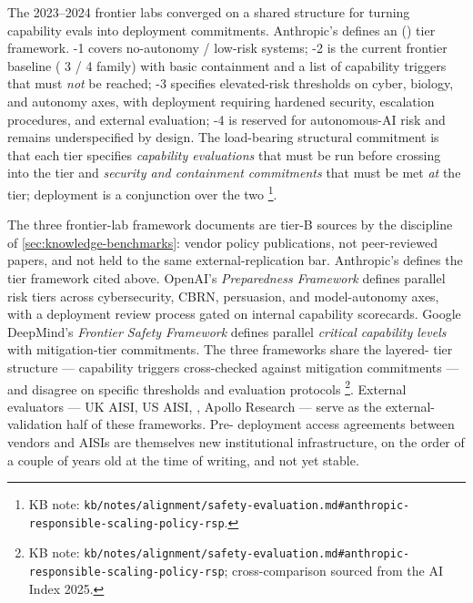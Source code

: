The 2023--2024 frontier labs converged on a shared structure for
turning capability evals into deployment commitments. Anthropic's
\emph{} \citep{anthropic-rsp-2024}
defines an  () tier framework. -1 covers
no-autonomy / low-risk systems; -2 is the current frontier
baseline ( 3 /  4 family) with basic containment and a
list of capability triggers that must \emph{not} be reached; -3
specifies elevated-risk thresholds on cyber, biology, and autonomy
axes, with deployment requiring hardened security, escalation
procedures, and external evaluation; -4 is reserved for
autonomous-AI risk and remains underspecified by design. The
load-bearing structural commitment is that each tier specifies
\emph{capability evaluations} that must be run before crossing into
the tier and \emph{security and containment commitments} that must be
met \emph{at} the tier; deployment is a conjunction over the two%
\footnote{KB note: \texttt{kb/notes/alignment/safety-evaluation.md\#anthropic-responsible-scaling-policy-rsp}.}.

\begin{forumsignal}
The three frontier-lab framework documents are tier-B sources by the
discipline of \cref{sec:knowledge-benchmarks}: vendor policy
publications, not peer-reviewed papers, and not held to the same
external-replication bar. Anthropic's 
\citep{anthropic-rsp-2024} defines the  tier framework cited
above. OpenAI's \emph{Preparedness Framework}
defines parallel risk tiers across cybersecurity, CBRN, persuasion,
and model-autonomy axes, with a deployment review process gated on
internal capability scorecards. Google DeepMind's \emph{Frontier
Safety Framework}
defines parallel \emph{critical capability levels} with
mitigation-tier commitments. The three frameworks share the layered-
tier structure --- capability triggers cross-checked against
mitigation commitments --- and disagree on specific thresholds and
evaluation protocols%
\footnote{KB note: \texttt{kb/notes/alignment/safety-evaluation.md\#anthropic-responsible-scaling-policy-rsp}; cross-comparison sourced from the AI Index 2025.}.
External evaluators --- UK AISI, US AISI, , Apollo Research ---
serve as the external-validation half of these frameworks. Pre-
deployment access agreements between vendors and AISIs are themselves
new institutional infrastructure, on the order of a couple of years
old at the time of writing, and not yet stable.
\end{forumsignal}

